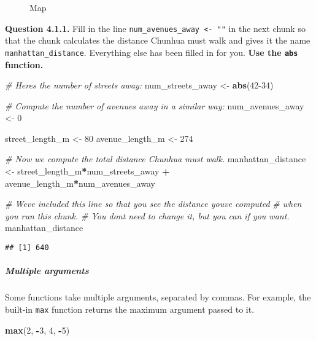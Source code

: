 \documentclass[
]{article}
\makeatletter
\newenvironment{Shaded}{\begin{snugshade}}{\end{snugshade}}
\newcommand{\CommentTok}[1]{\textcolor[rgb]{0.56,0.35,0.01}{\textit{#1}}}
\newcommand{\DecValTok}[1]{\textcolor[rgb]{0.00,0.00,0.81}{#1}}
\newcommand{\FunctionTok}[1]{\textcolor[rgb]{0.13,0.29,0.53}{\textbf{#1}}}
\newcommand{\NormalTok}[1]{#1}
\newcommand{\OtherTok}[1]{\textcolor[rgb]{0.56,0.35,0.01}{#1}}
\newcommand{\SpecialCharTok}[1]{\textcolor[rgb]{0.81,0.36,0.00}{\textbf{#1}}}
\newcommand*\pandocbounded[1]{%
  \sbox\pandoc@box{#1}%
  \Gscale@div\@tempa{\textheight}{\dimexpr\ht\pandoc@box+\dp\pandoc@box\relax}%
  \Gscale@div\@tempb{\linewidth}{\wd\pandoc@box}%
  \ifdim\@tempb\p@<\@tempa\p@\let\@tempa\@tempb\fi%
  \ifdim\@tempa\p@<\p@\scalebox{\@tempa}{\usebox\pandoc@box}%
  \else\usebox{\pandoc@box}%
  \fi%
}
\makeatother
\begin{document}
\begin{figure}
\centering
\pandocbounded{\texttt{[image: map.jpg]}}
\caption{Map}
\end{figure}

\textbf{Question 4.1.1.} Fill in the line
\texttt{num\_avenues\_away\ \textless{}-\ ""} in the next chunk so that
the chunk calculates the distance Chunhua must walk and gives it the
name \texttt{manhattan\_distance}. Everything else has been filled in
for you. \textbf{Use the \texttt{abs} function.}

\begin{Shaded}
\begin{Highlighting}[]
\CommentTok{\# Here\textquotesingle{}s the number of streets away:}
\NormalTok{num\_streets\_away }\OtherTok{\textless{}{-}} \FunctionTok{abs}\NormalTok{(}\DecValTok{42{-}34}\NormalTok{)}

\CommentTok{\# Compute the number of avenues away in a similar way:}
\NormalTok{num\_avenues\_away }\OtherTok{\textless{}{-}} \DecValTok{0}

\NormalTok{street\_length\_m }\OtherTok{\textless{}{-}} \DecValTok{80}
\NormalTok{avenue\_length\_m }\OtherTok{\textless{}{-}} \DecValTok{274}

\CommentTok{\# Now we compute the total distance Chunhua must walk.}
\NormalTok{manhattan\_distance }\OtherTok{\textless{}{-}}\NormalTok{ street\_length\_m}\SpecialCharTok{*}\NormalTok{num\_streets\_away }\SpecialCharTok{+}\NormalTok{ avenue\_length\_m}\SpecialCharTok{*}\NormalTok{num\_avenues\_away}

\CommentTok{\# We\textquotesingle{}ve included this line so that you see the distance you\textquotesingle{}ve computed }
\CommentTok{\# when you run this chunk.  }
\CommentTok{\# You don\textquotesingle{}t need to change it, but you can if you want.}
\NormalTok{manhattan\_distance}
\end{Highlighting}
\end{Shaded}

\begin{verbatim}
## [1] 640
\end{verbatim}

\subparagraph{Multiple arguments}\label{multiple-arguments}

Some functions take multiple arguments, separated by commas. For
example, the built-in \texttt{max} function returns the maximum argument
passed to it.

\begin{Shaded}
\begin{Highlighting}[]
\FunctionTok{max}\NormalTok{(}\DecValTok{2}\NormalTok{, }\SpecialCharTok{{-}}\DecValTok{3}\NormalTok{, }\DecValTok{4}\NormalTok{, }\SpecialCharTok{{-}}\DecValTok{5}\NormalTok{)}
\end{Highlighting}
\end{Shaded}
\end{document}
